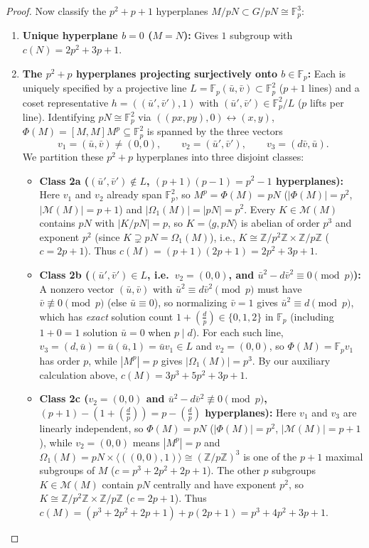 \documentclass[11pt,a4paper]{article}
\theoremstyle{definition}
\newcommand{\Fp}{\mathbb{F}_p}
\newcommand{\Leg}[2]{\left(\frac{#1}{#2}\right)}
\begin{document}
\begin{proof}
Now classify the $p^2 + p + 1$ hyperplanes $M/pN \subset G/pN \cong \Fp^3$:
\begin{enumerate}
  \item \textbf{Unique hyperplane $b = 0$ ($M = N$):} Gives $1$ subgroup with $c(N) = 2p^2 + 3p + 1$.
  \item \textbf{The $p^2 + p$ hyperplanes projecting surjectively onto $b \in \Fp$:} Each is uniquely specified by a projective line $L = \Fp(\bar{u}, \bar{v}) \subset \Fp^2$ ($p + 1$ lines) and a coset representative $h = ((\bar{u}', \bar{v}'), 1)$ with $(\bar{u}', \bar{v}') \in \Fp^2 / L$ ($p$ lifts per line). Identifying $pN \cong \Fp^2$ via $((px, py), 0) \leftrightarrow (x, y)$, $\Phi(M) = [M, M]M^p \subseteq \Fp^2$ is spanned by the three vectors
  \[
    v_1 = (\bar{u}, \bar{v}) \ne (0, 0), \qquad v_2 = (\bar{u}', \bar{v}'), \qquad v_3 = (d\bar{v}, \bar{u}).
  \]
  We partition these $p^2 + p$ hyperplanes into three disjoint classes:
  \begin{itemize}
    \item \textbf{Class 2a ($(\bar{u}', \bar{v}') \notin L$, $(p + 1)(p - 1) = p^2 - 1$ hyperplanes):} Here $v_1$ and $v_2$ already span $\Fp^2$, so $M^p = \Phi(M) = pN$ ($|\Phi(M)| = p^2$, $|\mathcal{M}(M)| = p + 1$) and $|\Omega_1(M)| = |pN| = p^2$. Every $K \in \mathcal{M}(M)$ contains $pN$ with $|K/pN| = p$, so $K = \langle g, pN \rangle$ is abelian of order $p^3$ and exponent $p^2$ (since $K \supsetneq pN = \Omega_1(M)$), i.e., $K \cong \mathbb{Z}/p^2\mathbb{Z} \times \mathbb{Z}/p\mathbb{Z}$ ($c = 2p + 1$). Thus $c(M) = (p + 1)(2p + 1) = 2p^2 + 3p + 1$.
    \item \textbf{Class 2b ($(\bar{u}', \bar{v}') \in L$, i.e.\ $v_2 = (0,0)$, and $\bar{u}^2 - d\bar{v}^2 \equiv 0 \pmod p$):} A nonzero vector $(\bar{u}, \bar{v})$ with $\bar{u}^2 \equiv d\bar{v}^2 \pmod p$ must have $\bar{v} \not\equiv 0 \pmod p$ (else $\bar{u} \equiv 0$), so normalizing $\bar{v} = 1$ gives $\bar{u}^2 \equiv d \pmod p$, which has \emph{exact} solution count $1 + \Leg{d}{p} \in \{0, 1, 2\}$ in $\Fp$ (including $1 + 0 = 1$ solution $\bar{u} = 0$ when $p \mid d$). For each such line, $v_3 = (d, \bar{u}) = \bar{u}(\bar{u}, 1) = \bar{u} v_1 \in L$ and $v_2 = (0, 0)$, so $\Phi(M) = \Fp v_1$ has order $p$, while $|M^p| = p$ gives $|\Omega_1(M)| = p^3$. By our auxiliary calculation above, $c(M) = 3p^3 + 5p^2 + 3p + 1$.
    \item \textbf{Class 2c ($v_2 = (0, 0)$ and $\bar{u}^2 - d\bar{v}^2 \not\equiv 0 \pmod p$, $(p + 1) - (1 + \Leg{d}{p}) = p - \Leg{d}{p}$ hyperplanes):} Here $v_1$ and $v_3$ are linearly independent, so $\Phi(M) = pN$ ($|\Phi(M)| = p^2$, $|\mathcal{M}(M)| = p + 1$), while $v_2 = (0, 0)$ means $|M^p| = p$ and $\Omega_1(M) = pN \times \langle ((0,0), 1) \rangle \cong (\mathbb{Z}/p\mathbb{Z})^3$ is one of the $p + 1$ maximal subgroups of $M$ ($c = p^3 + 2p^2 + 2p + 1$). The other $p$ subgroups $K \in \mathcal{M}(M)$ contain $pN$ centrally and have exponent $p^2$, so $K \cong \mathbb{Z}/p^2\mathbb{Z} \times \mathbb{Z}/p\mathbb{Z}$ ($c = 2p + 1$). Thus $c(M) = (p^3 + 2p^2 + 2p + 1) + p(2p + 1) = p^3 + 4p^2 + 3p + 1$.
  \end{itemize}
\end{enumerate}


\end{proof}
\end{document}
